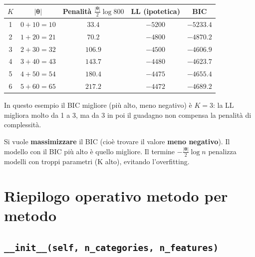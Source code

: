 \documentclass[11pt,a4paper]{article}
\begin{document}
\begin{exbox}[Esempio: BIC per diversi $K$ con $N=800$, $d=5$]
\begin{center}
\begin{tabular}{ccccc}
    \toprule
    $K$ & $|\boldsymbol{\theta}|$ & Penalit\`a $\frac{|\boldsymbol{\theta}|}{2}\log 800$ & LL (ipotetica) & BIC \\
    \midrule
    1 & $0 + 10 = 10$ & $33.4$ & $-5200$ & $-5233.4$ \\
    2 & $1 + 20 = 21$ & $70.2$ & $-4800$ & $-4870.2$ \\
    3 & $2 + 30 = 32$ & $106.9$ & $-4500$ & $-4606.9$ \\
    4 & $3 + 40 = 43$ & $143.7$ & $-4480$ & $-4623.7$ \\
    5 & $4 + 50 = 54$ & $180.4$ & $-4475$ & $-4655.4$ \\
    6 & $5 + 60 = 65$ & $217.2$ & $-4472$ & $-4689.2$ \\
    \bottomrule
\end{tabular}
\end{center}
In questo esempio il BIC migliore (pi\`u alto, meno negativo) \`e $K=3$: la LL migliora molto da 1 a 3, ma da 3 in poi il guadagno non compensa la penalit\`a di complessit\`a.
\end{exbox}

\begin{infobox}
Si vuole \textbf{massimizzare} il BIC (cio\`e trovare il valore \textbf{meno negativo}). Il modello con il BIC pi\`u alto \`e quello migliore. Il termine $-\frac{|\boldsymbol{\theta}|}{2}\log n$ penalizza modelli con troppi parametri (K alto), evitando l'overfitting.
\end{infobox}

\section{Riepilogo operativo metodo per metodo}

\subsection{\texttt{\_\_init\_\_(self, n\_categories, n\_features)}}
\end{document}
